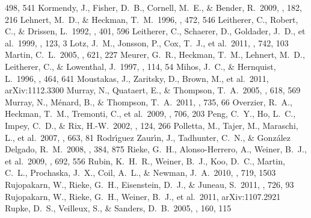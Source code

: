 \documentclass[apj]{emulateapj}
\begin{document}
\begin{thebibliography}{}
  498, 541
 Kormendy, J., Fisher, D.~B.,
  Cornell, M.~E., \& Bender, R.\ 2009, \apjs, 182, 216
 Lehnert, M.~D., \& Heckman,
  T.~M.\ 1996, \apj, 472, 546
 Leitherer, C., Robert, C., \&
  Drissen, L.\ 1992, \apj, 401, 596
 Leitherer, C., Schaerer, D.,
  Goldader, J.~D., et al.\ 1999, \apjs, 123, 3
 Lotz, J.~M., Jonsson, P., Cox,
  T.~J., et al.\ 2011, \apj, 742, 103
 Martin, C.~L.\ 2005, \apj, 621, 227
 Meurer, G.~R., Heckman, T.~M.,
  Lehnert, M.~D., Leitherer, C., \& Lowenthal, J.\ 1997, \aj, 114, 54
 Mihos, J.~C., \& Hernquist,
  L.\ 1996, \apj, 464, 641
 Moustakas, J., Zaritsky, D.,
  Brown, M., et al.\ 2011, arXiv:1112.3300
 Murray, N., Quataert, E., \&
  Thompson, T.~A.\ 2005, \apj, 618, 569
 Murray, N., M{\'e}nard, B., \&
  Thompson, T.~A.\ 2011, \apj, 735, 66
 Overzier, R.~A., Heckman,
  T.~M., Tremonti, C., et al.\ 2009, \apj, 706, 203
 Peng, C.~Y., Ho, L.~C., Impey,
  C.~D., \& Rix, H.-W.\ 2002, \aj, 124, 266
 Polletta, M., Tajer, M.,
  Maraschi, L., et al.\ 2007, \apj, 663, 81
  Rodr{\'{\i}}guez Zaur{\'{\i}}n, J., Tadhunter, C.~N., \&
  Gonz{\'a}lez Delgado, R.~M.\ 2008, \mnras, 384, 875
 Rieke, G.~H., Alonso-Herrero, A.,
  Weiner, B.~J., et al.\ 2009, \apj, 692, 556
 Rubin, K.~H.~R., Weiner, B.~J.,
  Koo, D.~C., Martin, C.~L., Prochaska, J.~X., Coil, A.~L., \& Newman,
  J.~A.\ 2010, \apj, 719, 1503
 Rujopakarn, W.,
  Rieke, G.~H., Eisenstein, D.~J., \& Juneau, S.\ 2011, \apj, 726, 93
 Rujopakarn, W., Rieke, G.~H.,
  Weiner, B.~J., et al.\ 2011, arXiv:1107.2921
 Rupke, D.~S., Veilleux, S., \&
  Sanders, D.~B.\ 2005, \apjs, 160, 115 

\end{thebibliography}
\end{document}
